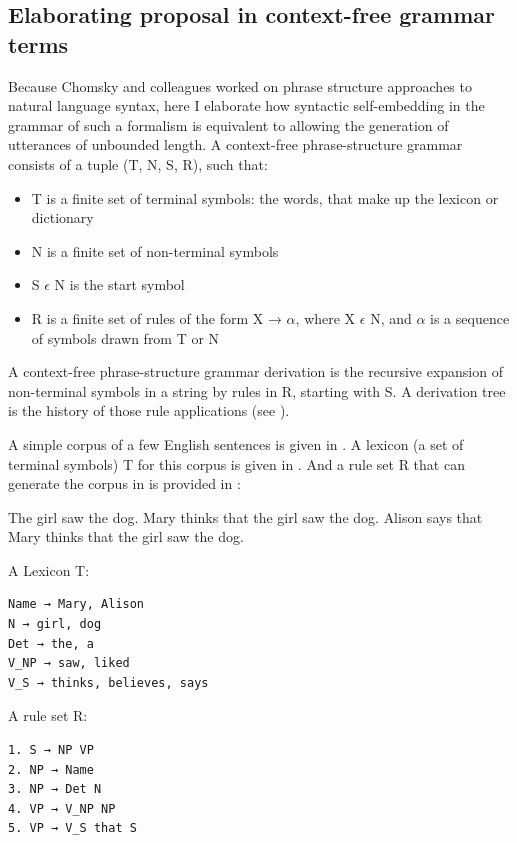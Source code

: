 \documentclass{article}
\begin{document}
\subsection{Elaborating  proposal in context-free grammar terms}

Because Chomsky and colleagues worked on phrase structure approaches to natural language syntax, here I elaborate how syntactic self-embedding in the grammar of such a formalism is equivalent to allowing the generation of utterances of unbounded length. A context-free phrase-structure grammar consists of a tuple (T, N, S, R), such that:

\begin{itemize}
    \item T is a finite set of terminal symbols: the words, that make up the lexicon or dictionary
    \item N is a finite set of non-terminal symbols
    \item S $\epsilon$ N is the start symbol
    \item R is a finite set of rules of the form X → $\alpha$, where X $\epsilon$ N, and $\alpha$ is a sequence of symbols drawn from T or N
\end{itemize}

A context-free phrase-structure grammar derivation is the recursive expansion of non-terminal symbols in a string by rules in R, starting with S. A derivation tree is the history of those rule applications (see \citealt{chomsky1959certain, lewis1998elements, hopcroft2001introduction}).

A simple corpus of a few English sentences is given in . A lexicon (a set of terminal symbols) T for this corpus is given in . And a rule set R that can generate the corpus in  is provided in :

\eal
\label{corpus1}
\ex\label{corpus1a} The girl saw the dog.
\ex\label{corpus1c} Mary thinks that the girl saw the dog.
\ex\label{corpus1d} Alison says that Mary thinks that the girl saw the dog.
\zl

\ea
\label{lexicon1}
A Lexicon T:
\begin{verbatim}
Name → Mary, Alison
N → girl, dog
Det → the, a
V_NP → saw, liked
V_S → thinks, believes, says
\end{verbatim}
\z

\ea
\label{cfg1}
A rule set R:
\begin{verbatim}
1. S → NP VP
2. NP → Name
3. NP → Det N
4. VP → V_NP NP
5. VP → V_S that S
\end{verbatim}
\z
\end{document}

